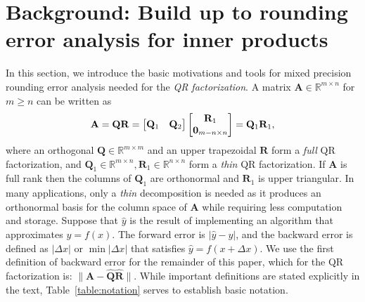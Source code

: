 \documentclass[review,onefignum,onetabnum]{siamart190516}
\newcommand{\R}{\mathbb{R}}
\newcommand{\bb}[1]{\mathbf{#1}}
\begin{document}
\section{Background: Build up to rounding error analysis for inner products}\label{sec:background}
In this section, we introduce the basic motivations and tools for mixed precision rounding error analysis needed for the {\it QR factorization}.
A matrix $\bb{A} \in \R^{m \times n}$ for $m\geq n$ can be written as
\[\bb{A} = \bb{QR}=\begin{bmatrix}\bb{Q}_{1} & \bb{Q}_2\end{bmatrix} \begin{bmatrix}\bb{R}_{1} \\ \bb{0}_{m-n \times n}\end{bmatrix} = \bb{Q}_{1}\bb{R}_{1},\vspace{-0.3cm}
\]
where an orthogonal $\bb{Q}\in\R^{m\times m}$ and an upper trapezoidal $\bb{R}$ form a \emph{full} QR factorization, and $\bb{Q}_{1}\in\R^{m\times n},\bb{R}_{1}\in\R^{n\times n}$ form a \emph{thin} QR factorization.
If $\bb{A}$ is full rank then the columns of $\bb{Q}_{1}$ are orthonormal
and $\bb{R}_1$ is upper triangular.
In many applications, only a \emph{thin} decomposition is needed as it produces an orthonormal basis for the column space of $\bb{A}$ while requiring less computation and storage.
Suppose that $\hat{y}$ is the result of implementing an algorithm that approximates $y=f(x)$.
The forward error is $|\hat{y}-y|$, and the backward error is defined as $|\Delta x|$ or $\min |\Delta x|$ that satisfies $\hat{y}=f(x+\Delta x)$. 
We use the first definition of backward error for the remainder of this paper, which for the QR factorization is: $\|\bb{A}-\hat{\bb{Q}}\hat{\bb{R}}\|$.
While important definitions are stated explicitly in the text, Table~\ref{table:notation} serves to establish basic notation.
%
\end{document}
